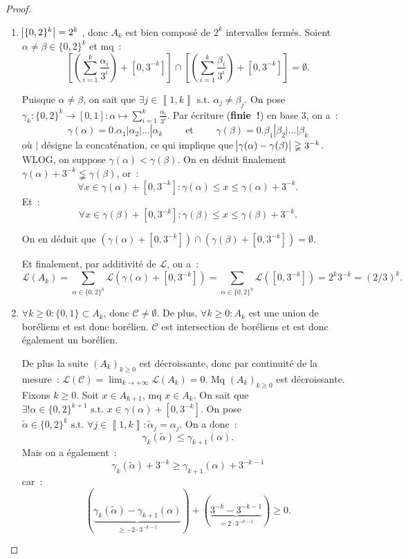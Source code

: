 \documentclass{article}
\theoremstyle{definition}
\newcommand{\pinfty}{{+\infty}}
\newcommand{\st}{\text{ s.t. }}
\newcommand{\intint}[2]{\left\llbracket#1, #2\right\rrbracket}
\begin{document}
\begin{proof}~
\begin{enumerate}
	\item $\abs {\{0, 2\}^k} = 2^k$ , donc $A_k$ est bien composé de $2^k$ intervalles fermés. Soient $\alpha \neq \beta \in \{0, 2\}^k$ et mq~:
	\[\left[\left(\sum_{i=1}^k\frac {\alpha_i}{3^i}\right) + [0, 3^{-k}]\right] \cap \left[\left(\sum_{i=1}^k\frac {\beta_i}{3^i}\right) + [0, 3^{-k}]\right] = \emptyset.\]

	Puisque $\alpha \neq \beta$, on sait que $\exists j \in \intint 1k \st \alpha_j \neq \beta_j$. On pose $\gamma_k : \{0, 2\}^k \to [0, 1] :
	\alpha \mapsto \sum_{i=1}^k\frac {\alpha_i}{3^i}$. Par écriture (\textbf{finie~!}) en base 3, on a~:
	\[\gamma(\alpha) = 0.\alpha_1|\alpha_2|\ldots|\alpha_k \qquad \text{ et } \qquad \gamma(\beta) = 0.\beta_1|\beta_2|\ldots|\beta_k\]
	où $|$ désigne la concaténation, ce qui implique que $\abs {\gamma(\alpha) - \gamma(\beta)} \gneqq 3^{-k}$. WLOG, on suppose $\gamma(\alpha) < \gamma(\beta)$.
	On en déduit finalement $\gamma(\alpha) + 3^{-k} \lneqq \gamma(\beta)$, or~:
	\[\forall x \in \gamma(\alpha) + [0, 3^{-k}] : \gamma(\alpha) \leq x \leq \gamma(\alpha) + 3^{-k}.\]
	Et~:
	\[\forall x \in \gamma(\beta) + [0, 3^{-k}] : \gamma(\beta) \leq x \leq \gamma(\beta) + 3^{-k}.\]

	On en déduit que $\left(\gamma(\alpha) + [0, 3^{-k}]\right) \cap \left(\gamma(\beta) + [0, 3^{-k}]\right) = \emptyset$.

	Et finalement, par additivité de $\mathcal L$, on a~:
	\[\mathcal L(A_k) = \sum_{\alpha \in \{0, 2\}^k}\mathcal L(\gamma(\alpha)+[0, 3^{-k}]) = \sum_{\alpha \in \{0, 2\}^k}\mathcal L([0, 3^{-k}]) = 2^k3^{-k} = (2/3)^k.\]

	\item $\forall k \geq 0 : \{0, 1\} \subset A_k$, donc $\mathscr C \neq \emptyset$. De plus, $\forall k \geq 0 : A_k$ est une union de boréliens et est donc borélien.
	$\mathscr C$ est intersection de boréliens et est donc également un borélien.

	De plus la suite $(A_k)_{k \geq 0}$ est décroissante, donc par continuité de la mesure~: $\mathcal L(\mathscr C) = \lim_{k \to \pinfty}\mathcal L(A_k) = 0$.
	Mq $(A_k)_{k \geq 0}$ est décroissante. Fixons $k \geq 0$. Soit $x \in A_{k+1}$, mq $x \in A_k$. On sait que $\exists! \alpha \in \{0, 2\}^{k+1} \st x \in \gamma(\alpha)+[0, 3^{-k}]$.
	On pose $\tilde \alpha \in \{0, 2\}^k \st \forall j \in \intint 1k : \tilde \alpha_j = \alpha_j$. On a donc~:
	\[\gamma_k(\tilde \alpha) \leq \gamma_{k+1}(\alpha).\]
	Mais on a également~:
	\[\gamma_k(\tilde \alpha) + 3^{-k} \geq \gamma_{k+1}(\alpha) + 3^{-k-1}\]
	car~:
	\[(\underbrace {\gamma_k(\tilde \alpha) - \gamma_{k+1}(\alpha)}_{\geq -2 \cdot 3^{-k-1}}) + (\underbrace {3^{-k} - 3^{-k-1}}_{=2\cdot 3^{-k-1}}) \geq 0.\]


\end{enumerate}
\end{proof}
\end{document}
